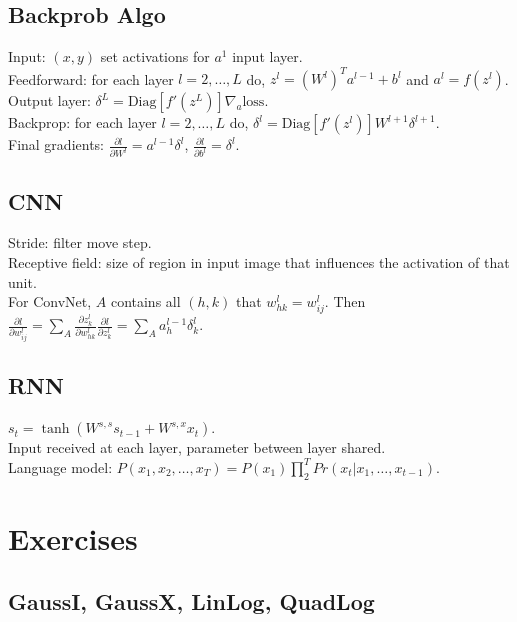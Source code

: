 \subsection*{Backprob Algo}
Input: $(x, y)$ set activations for $a^1$ input layer.\\
Feedforward: for each layer $l=2, \dots, L$ do, $z^l = (W^l)^T a^{l-1} + b^l$ and $a^l = f(z^l)$.\\
Output layer: $\delta^L = \text{Diag}[f'(z^L)]\nabla_a \text{loss}$.\\
Backprop: for each layer $l=2, \dots, L$ do, $\delta^l = \text{Diag}[f'(z^l)]W^{l+1}\delta^{l+1}$.\\
Final gradients: $\frac{\partial l}{\partial W^l} = a^{l-1}\delta^l$, $\frac{\partial l}{\partial b^l} = \delta^l$.

\subsection*{CNN}

Stride: filter move step.\\
Receptive field: size of region in input image that influences the activation of that unit.\\
For ConvNet, $A$ contains all $(h, k)$ that $w_{hk}^l=w_{ij}^l$. Then $\frac{\partial l}{\partial w_{ij}^l} = \sum_A \frac{\partial z_k^l}{\partial w_{hk}^l} \frac{\partial l}{\partial z_k^l} = \sum_A a_h^{l-1} \delta_k^l$.

\subsection*{RNN}

$s_t = \tanh(W^{s,s}s_{t-1} + W^{s, x}x_t)$.\\
Input received at each layer, parameter between layer shared.\\
Language model: $P(x_1, x_2, \dots, x_T) = P(x_1)\prod_2^T Pr(x_t|x_1, \dots, x_{t-1})$.

\section{Exercises}

\subsection*{GaussI, GaussX, LinLog, QuadLog}

